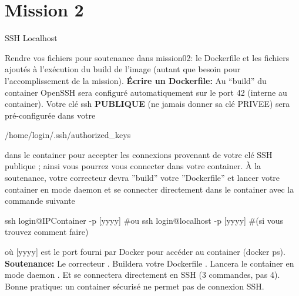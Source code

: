 \documentclass{42}
\begin{document}
	\newpage

\section{Mission 2}
\begin{center}
	{\Huge SSH Localhost}
\end{center}

Rendre vos fichiers pour soutenance dans mission02: le Dockerfile et les fichiers ajoutés à l’exécution du build de l’image (autant que besoin pour l’accomplissement de la mission).
\newline
\newline
\textbf{Écrire un Dockerfile:}
\newline
Au “build” du container OpenSSH sera configuré automatiquement sur le port 42 (interne au container).
\newline
\newline
Votre clé ssh \textbf{PUBLIQUE} (ne jamais donner sa clé PRIVEE) sera pré-configurée dans votre
\begin{42console}
/home/login/.ssh/authorized_keys
\end{42console}
dans le container pour accepter les connexions provenant de votre clé SSH publique ; ainsi vous pourrez vous connecter dans votre container.
\newline
\newline
À la soutenance, votre correcteur devra ''build'' votre ''Dockerfile'' et lancer votre container en mode daemon et se connecter directement dans le container avec la commande suivante
\begin{42console}
ssh login@IPContainer -p [yyyy] #ou
ssh login@localhost -p [yyyy] #(si vous trouvez comment faire)
\end{42console}
où [yyyy] est le port fourni par Docker pour accéder au container (docker ps).
\newline
\newline
\textbf{Soutenance:}
\newline
\newline
Le correcteur
. Buildera votre Dockerfile
. Lancera le container en mode daemon
. Et se connectera directement en SSH
\newline
(3 commandes, pas 4).
\newline
\newline
\info
{
	Bonne pratique: un container sécurisé ne permet pas de connexion SSH.
}
\end{document}
